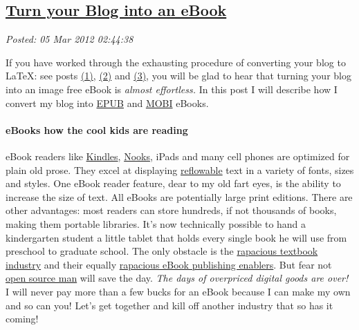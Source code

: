 %

\subsection*{\href{https://bakerjd99.wordpress.com/2012/03/04/turn-your-blog-into-an-ebook/}{Turn your Blog into an eBook}}


\noindent\emph{Posted: 05 Mar 2012 02:44:38}
\vspace{6pt}

If you have worked through the exhausting procedure of converting your
blog to \LaTeX: see posts
\href{http://bakerjd99.wordpress.com/2012/02/11/wordpress-to-latex-with-pandoc-and-j-prerequisites-part-1/}{(1)},
\href{http://bakerjd99.wordpress.com/2012/02/18/wordpress-to-latex-with-pandoc-and-j-latex-directories-part-2-2/}{(2)}
and
\href{http://bakerjd99.wordpress.com/2012/02/25/wordpress-to-latex-with-pandoc-and-j-using-texfrwpxml-ijs-part-3/}{(3)},
you will be glad to hear that turning your blog into an image free eBook
is \emph{almost effortless.} In this post I will describe how I convert
my blog into \href{http://www.web-books.com/Publishing/epub.htm}{EPUB}
and \href{http://wiki.mobileread.com/wiki/MOBI}{MOBI} eBooks.

\paragraph{eBooks how the cool kids are reading}

eBook readers like
\href{http://www.amazon.com/gp/feature.html?ie=UTF8\&docId=1000750701\&tag=googhydr-20\&hvadid=9562889797\&ref=pd\_sl\_1hhrk6zi46\_e}{Kindles},
\href{http://www.barnesandnoble.com/u/nook/379003208?r=1\&utm\_source=google\&cm\_mmc=Google-\_-NOOK\%20General-\_-NOOK\%20(exact)-\_-Nook\&cm\_mmca1=1d6c97e6-5d23-2769-73f9-00005e04715e\&utm\_medium=cpc\&utm\_term=no}{Nooks},
iPads and many cell phones are optimized for plain old prose. They excel
at displaying
\href{http://www.pcmag.com/encyclopedia\_term/0,2542,t=reflowable+text\&i=58163,00.asp}{reflowable}
text in a variety of fonts, sizes and styles. One eBook reader feature,
dear to my old fart eyes, is the ability to increase the size of text.
All eBooks are potentially large print editions. There are other
advantages: most readers can store hundreds, if not thousands of books,
making them portable libraries. It's now technically possible to hand a
kindergarten student a little tablet that holds every single book he
will use from preschool to graduate school. The only obstacle is the
\href{http://funny-about-money.com/2010/07/20/textbook-ripoffs-why-college-leaves-kids-in-debt/}{rapacious
textbook industry} and their equally
\href{http://www.zdnet.com/blog/mobile-news/why-the-apple-textbook-program-will-never-work/6526}{rapacious
eBook publishing enablers}. But fear not
\href{http://www.techradar.com/news/software/why-is-open-source-dominated-by-men--1047390}{open
source man} will save the day. \emph{The days of overpriced digital
goods are over!} I will never pay more than a few bucks for an eBook
because I can make my own and so can you! Let's get together and kill
off another industry that so has it coming!

